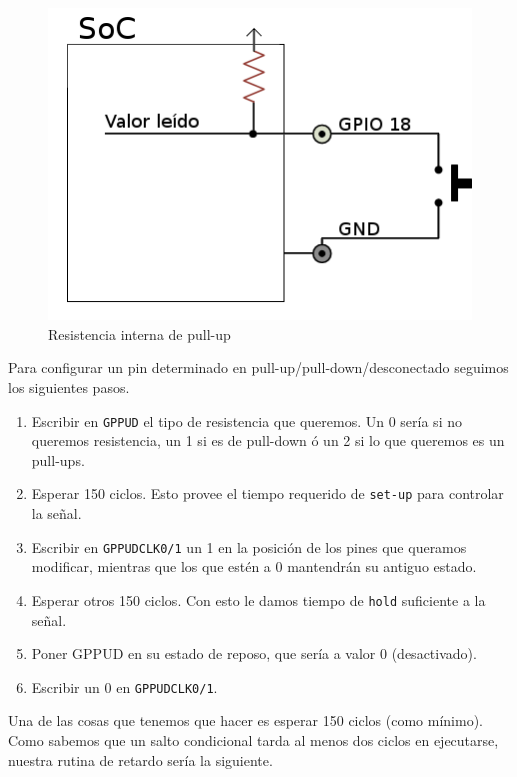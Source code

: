 \begin{figure}[h]
  \centering
    \includegraphics[width=13cm]{graphs/pullup.png}
  \caption{Resistencia interna de pull-up}
  \label{fig:pullup}
\end{figure}

Para configurar un pin determinado en pull-up/pull-down/desconectado seguimos los
siguientes pasos.

\begin{enumerate}
  \item Escribir en {\tt GPPUD} el tipo de resistencia que queremos. Un 0 sería
si no queremos resistencia, un 1 si es de pull-down ó un 2 si lo que queremos es un
pull-ups.
  \item Esperar 150 ciclos. Esto provee el tiempo requerido de {\tt set-up} para controlar la señal.
  \item Escribir en {\tt GPPUDCLK0/1} un 1 en la posición de los pines que queramos modificar,
mientras que los que estén a 0 mantendrán su antiguo estado.
  \item Esperar otros 150 ciclos. Con esto le damos tiempo de {\tt hold} suficiente a la señal.
  \item Poner GPPUD en su estado de reposo, que sería a valor 0 (desactivado).
  \item Escribir un 0 en {\tt GPPUDCLK0/1}.
\end{enumerate}

Una de las cosas que tenemos que hacer es esperar 150 ciclos (como mínimo). Como
sabemos que un salto condicional tarda al menos dos ciclos en ejecutarse, nuestra rutina
de retardo sería la siguiente.

